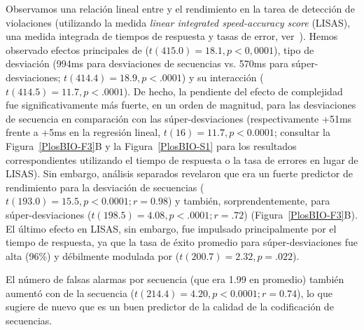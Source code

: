 Observamos una relación lineal entre \mdlbin y el rendimiento en la tarea de detección de violaciones (utilizando la medida \textit{linear integrated speed-accuracy score} (LISAS), una medida integrada de tiempos de respuesta y tasas de error, ver~\cite{f87,f88}). Hemos observado efectos principales de \mdlbin ($t(415.0) = 18.1, p <0,0001$), tipo de desviación (994ms para desviaciones de secuencias vs. 570ms para súper-desviaciones; $t (414.4) = 18.9, p < .0001$) y su interacción ($t(414.5) = 11. 7, p < .0001$). De hecho, la pendiente del efecto de complejidad fue significativamente más fuerte, en un orden de magnitud, para las desviaciones de secuencia en comparación con las súper-desviaciones (respectivamente +51ms frente a +5ms en la regresión lineal, $t(16) = 11.7, p <0.0001$; consultar la Figura~\ref{PlosBIO-F3}B y la Figura~\ref{PlosBIO-S1} para los resultados correspondientes utilizando el tiempo de respuesta o la tasa de errores en lugar de LISAS). Sin embargo, análisis separados revelaron que \mdlbin era un fuerte predictor de rendimiento para la desviación de secuencias ($t(193.0) = 15.5, p <0.0001; r = 0.98$) y también, sorprendentemente, para súper-desviaciones ($t (198.5) = 4.08, p < .0001; r = .72$) (Figura~\ref{PlosBIO-F3}B). El último efecto en LISAS, sin embargo, fue impulsado principalmente por el tiempo de respuesta, ya que la tasa de éxito promedio para súper-desviaciones fue alta (96\%) y débilmente modulada por \mdlbin ($t(200.7) = 2.32, p = .022$).


El número de falsas alarmas por secuencia (que era 1.99 en promedio) también aumentó con \mdlbin de la secuencia ($t(214.4)= 4.20, p <0.0001; r = 0.74$), lo que sugiere de nuevo que \mdlbin es un buen predictor de la calidad de la codificación de secuencias.


